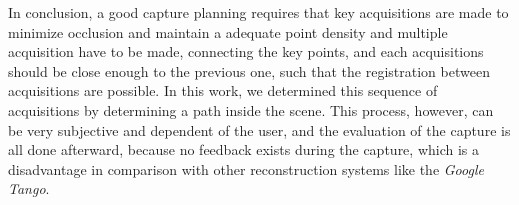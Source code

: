 In conclusion, a good capture planning requires that key acquisitions are made to minimize occlusion and maintain a adequate point density and multiple acquisition have to be made, connecting the key points, and each acquisitions should be close enough to the previous one, such that the registration between acquisitions are possible. In this work, we determined this sequence of acquisitions by determining a path inside the scene. This process, however, can be very subjective and dependent of the user, and the evaluation of the capture is all done afterward, because no feedback exists during the capture, which is a disadvantage in comparison with other reconstruction systems like the \textit{Google Tango}.

